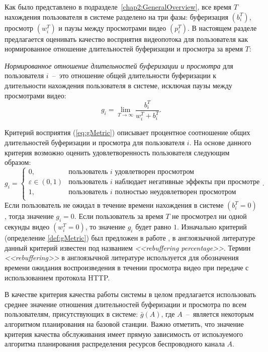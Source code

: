 Как было представлено в подразделе~\ref{chap2:GeneralOverview}, все время $T$ нахождения пользователя в системе разделено на три фазы: буферизация $\left( b_i^T \right)$, просмотр $\left( w_i^T \right)$ и паузы между просмотрами видео $\left( p_i^T \right)$. В настоящем разделе предлагается оценивать качество восприятия видеопотока для пользователя как нормированное отношение длительностей буферизации и просмотра за время $T$:
\begin{definition}
\label{def:gMetric}
    \emph{Нормированное отношение длительностей буферизации и просмотра} для пользователя $i$~--~это отношение общей длительности буферизации к длительности нахождения пользователя в системе, исключая паузы между просмотрами видео:
    \emph{
    \begin{equation}
    	\label{eq:gMetric}
		g_i = \lim\limits_{T\rightarrow\infty} \frac{b_i^T}{w_i^T + b_i^T}.
	\end{equation}
	}
\end{definition}

Критерий восприятия (\ref{eq:gMetric}) описывает процентное соотношение общих длительностей буферизации и просмотра для пользователя $i$. На основе данного критерия возможно оценить удовлетворенность пользователя следующим образом:
$$g_i=
\begin{cases}
0, & \text{пользователь $i$ удовлетворен просмотром}\\
\varepsilon \in (0,1) & \text{пользователь $i$ наблюдает негативные эффекты при просмотре}\\
1, & \text{пользователь $i$ полностью неудовлетворен просмотром}\\
\end{cases}.
$$
Если пользователь не ожидал в течение времени нахождения в системе $\left(b_i^T = 0\right)$, тогда значение $g_i = 0$.
Если пользователь за время $T$ не просмотрел ни одной секунды видео $\left(w_i^T = 0\right)$, то значение $g_i$ будет равно $1$. Изначально критерий (определение \ref{def:gMetric}) был предложен в работе \cite{QoE_enhancement}, в англоязычной литературе данный критерий известен под названием \textit{<<rebuffering percentage>>}. Термин \textit{<<rebuffering>>} в англоязычной литературе используется для обозначения времени ожидания воспроизведения в течении просмотра видео при передаче с использованием протокола HTTP.

В качестве критерия качества работы системы в целом предлагается использовать среднее значение отношения длительностей буферизации и просмотра по всем пользователям, присутствующих в системе: $\bar{g}\left(A\right)$, где $A$~--~является некоторым алгоритмом планирования на базовой станции. Важно отметить, что значение критерия качества обслуживания имеет прямую зависимость от испоьзуемого алгоритма планирования распределения ресурсов беспроводного канала $A$.

